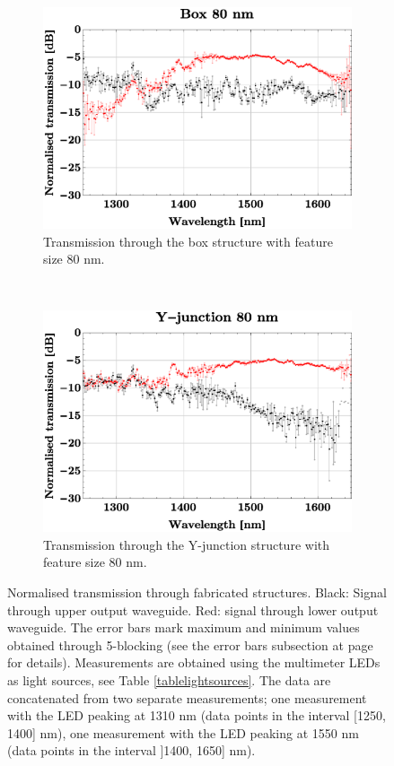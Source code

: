 \begin{figure}[H]
    \vspace{5 mm}
    
    \begin{subfigure}[h]{0.5\textwidth}
        \centering
        \includegraphics[width=1.0\textwidth]
        {fig/Kilde2Multimeter/box80multimeterconcatenated.eps}
        \caption{Transmission through the box structure with feature size 80 nm.}
    \end{subfigure}%
    ~ 
    \begin{subfigure}[h]{0.50\textwidth}
        \centering
        \includegraphics[width=1.0\textwidth]
        {fig/Kilde2Multimeter/yjunc80multimeterconcatenated.eps}
        \caption{Transmission through the Y-junction structure with feature size 80 nm.}
    \end{subfigure}
    \caption{Normalised transmission through fabricated structures. Black: Signal through upper output waveguide. Red: signal through lower output waveguide. The error bars mark maximum and minimum values obtained through 5-blocking (see the error bars subsection at page \pageref{sec:errorbars} for details). Measurements are obtained using the multimeter LEDs as light sources, see Table \ref{tablelightsources}.  The data are concatenated from two separate measurements; one measurement with the LED peaking at 1310 nm (data points in the interval  [1250, 1400] nm), one measurement with the LED peaking at 1550 nm (data points in the interval ]1400, 1650] nm).}
    \label{fig:transmissionkilde2conc}
    

\end{figure}
